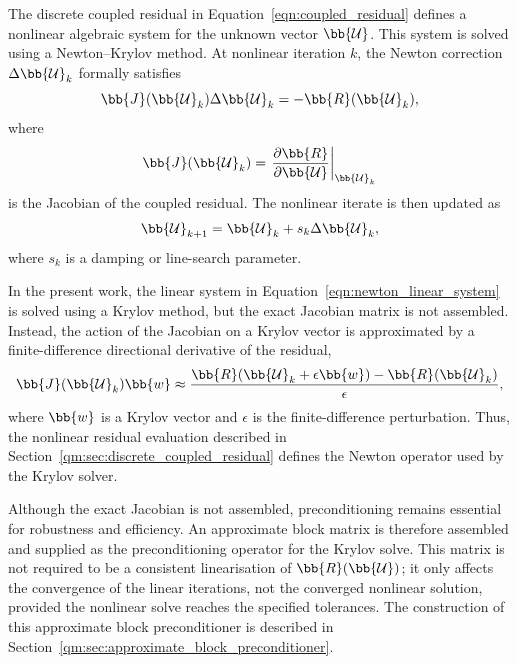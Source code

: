 The discrete coupled residual in Equation~\eqref{eqn:coupled_residual} defines
a nonlinear algebraic system for the unknown vector $\bb{\mathcal{U}}$. This system is
solved using a Newton--Krylov method. At nonlinear iteration $k$, the Newton
correction $\Delta \bb{\mathcal{U}}_k$ formally satisfies
\begin{equation}
    \bb{J}(\bb{\mathcal{U}}_k)
    \Delta \bb{\mathcal{U}}_k
    =
    -
    \bb{R}(\bb{\mathcal{U}}_k),
    \label{qm:eqn:newton_linear_system}
\end{equation}
where
\begin{equation}
    \bb{J}(\bb{\mathcal{U}}_k)
    =
    \left.
    \frac{\partial \bb{R}}{\partial \bb{\mathcal{U}}}
    \right|_{\bb{\mathcal{U}}_k}
\end{equation}
is the Jacobian of the coupled residual. The nonlinear iterate is then updated
as
\begin{equation}
    \bb{\mathcal{U}}_{k+1}
    =
    \bb{\mathcal{U}}_k
    +
    s_k \Delta \bb{\mathcal{U}}_k ,
    \label{qm:eqn:newton_update}
\end{equation}
where $s_k$ is a damping or line-search parameter.

In the present work, the linear system in
Equation~\eqref{eqn:newton_linear_system} is solved using a Krylov method, but
the exact Jacobian matrix is not assembled. Instead, the action of the Jacobian
on a Krylov vector is approximated by a finite-difference directional
derivative of the residual,
\begin{equation}
    \bb{J}(\bb{\mathcal{U}}_k) \bb{w}
    \approx
    \frac{
    \bb{R}(\bb{\mathcal{U}}_k + \epsilon \bb{w})
    -
    \bb{R}(\bb{\mathcal{U}}_k)
    }
    {\epsilon},
    \label{qm:eqn:jfnk_operator}
\end{equation}
where $\bb{w}$ is a Krylov vector and $\epsilon$ is the finite-difference perturbation.
Thus, the nonlinear residual evaluation described in Section~\ref{qm:sec:discrete_coupled_residual} defines the Newton operator used by the Krylov solver.

Although the exact Jacobian is not assembled, preconditioning remains essential for robustness and efficiency. An approximate block matrix is therefore assembled and supplied as the preconditioning operator for the Krylov solve.
This matrix is not required to be a consistent linearisation of $\bb{R}(\bb{\mathcal{U}})$; it only affects the convergence of the linear iterations, not the converged nonlinear solution, provided the nonlinear solve reaches the specified tolerances. The construction of this approximate block preconditioner is described in Section~\ref{qm:sec:approximate_block_preconditioner}.

